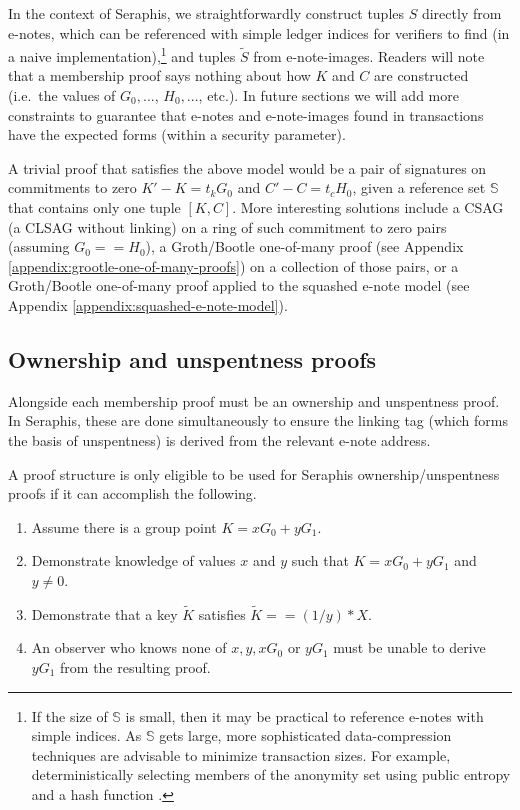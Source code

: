 In the context of Seraphis, we straightforwardly construct tuples $S$ directly from e-notes, which can be referenced with simple ledger indices for verifiers to find (in a naive implementation),\footnote{If the size of $\mathbb{S}$ is small, then it may be practical to reference e-notes with simple indices. As $\mathbb{S}$ gets large, more sophisticated data-compression techniques are advisable to minimize transaction sizes. For example, deterministically selecting members of the anonymity set using public entropy and a hash function \cite{chator-green-how-to-squeeze-crowd}.} and tuples $\tilde{S}$ from e-note-images. Readers will note that a membership proof says nothing about how $K$ and $C$ are constructed (i.e.\ the values of $G_0,...$, $H_0,...$, etc.). In future sections we will add more constraints to guarantee that e-notes and e-note-images found in transactions have the expected forms (within a security parameter).

A trivial proof that satisfies the above model would be a pair of signatures on commitments to zero $K' - K = t_k G_0$ and $C' - C = t_c H_0$, given a reference set $\mathbb{S}$ that contains only one tuple $[K, C]$. More interesting solutions include a CSAG (a CLSAG \cite{clsag-eprint} without linking) on a ring of such commitment to zero pairs (assuming $G_0 == H_0$), a Groth/Bootle \cite{...} one-of-many proof (see Appendix \ref{appendix:grootle-one-of-many-proofs}) on a collection of those pairs, or a Groth/Bootle one-of-many proof applied to the squashed e-note model (see Appendix \ref{appendix:squashed-e-note-model}).


\subsection{Ownership and unspentness proofs}
\label{subsec:seraphis-ownership-unspentness-proofs}

Alongside each membership proof must be an ownership and unspentness proof. In Seraphis, these are done simultaneously to ensure the linking tag (which forms the basis of unspentness) is derived from the relevant e-note address.

A proof structure is only eligible to be used for Seraphis ownership/unspentness proofs if it can accomplish the following.

\begin{enumerate}
    \item Assume there is a group point $K = x G_0 + y G_1$.

    \item Demonstrate knowledge of values $x$ and $y$ such that $K = x G_0 + y G_1$ and $y \neq 0$.

    \item Demonstrate that a key $\tilde{K}$ satisfies $\tilde{K} == (1/y)*X$.

    \item An observer who knows none of $x, y, x G_0$ or $y G_1$ must be unable to derive $y G_1$ from the resulting proof.
\end{enumerate}

